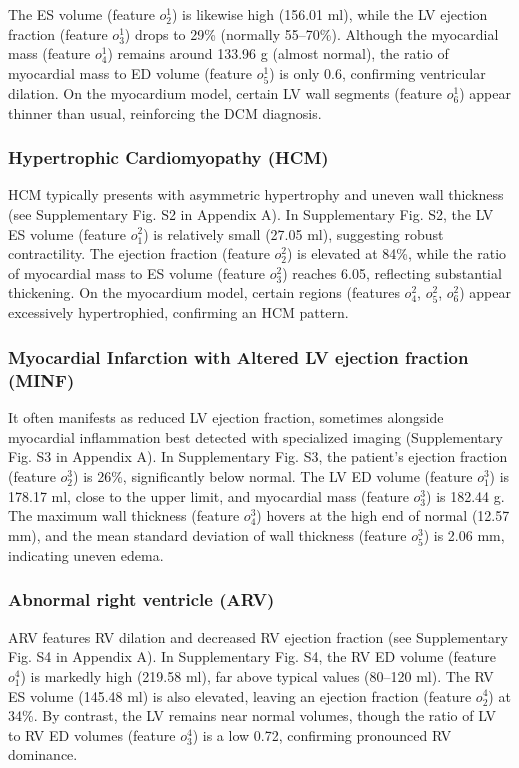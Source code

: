 \documentclass[fleqn,10pt]{wlscirep}
\begin{document}
The ES volume (feature \(o_2^1\)) is likewise high (156.01 ml), while the LV ejection fraction (feature \(o_3^1\)) drops to 29\% (normally 55–70\%). Although the myocardial mass (feature \(o_4^1\)) remains around 133.96 g (almost normal), the ratio of myocardial mass to ED volume (feature \(o_5^1\)) is only 0.6, confirming ventricular dilation. On the myocardium model, certain LV wall segments (feature \(o_6^1\)) appear thinner than usual, reinforcing the DCM diagnosis.

\subsubsection*{Hypertrophic Cardiomyopathy (HCM)}

HCM typically presents with asymmetric hypertrophy and uneven wall thickness (see Supplementary Fig. S2 in Appendix A). In Supplementary Fig. S2, the LV ES volume (feature \(o_1^2\)) is relatively small (27.05 ml), suggesting robust contractility. The ejection fraction (feature \(o_2^2\)) is elevated at 84\%, while the ratio of myocardial mass to ES volume (feature \(o_3^2\)) reaches 6.05, reflecting substantial thickening. On the myocardium model, certain regions (features \(o_4^2\), \(o_5^2\), \(o_6^2\)) appear excessively hypertrophied, confirming an HCM pattern.

\subsubsection*{Myocardial Infarction with Altered LV ejection fraction (MINF)}

It often manifests as reduced LV ejection fraction, sometimes alongside myocardial inflammation best detected with specialized imaging (Supplementary Fig. S3 in Appendix A). In Supplementary Fig. S3, the patient’s ejection fraction (feature \(o_2^3\)) is 26\%, significantly below normal. The LV ED volume (feature \(o_1^3\)) is 178.17 ml, close to the upper limit, and myocardial mass (feature \(o_3^3\)) is 182.44 g. The maximum wall thickness (feature \(o_4^3\)) hovers at the high end of normal (12.57 mm), and the mean standard deviation of wall thickness (feature \(o_5^3\)) is 2.06 mm, indicating uneven edema.

\subsubsection*{Abnormal right ventricle (ARV)}

ARV features RV dilation and decreased RV ejection fraction (see Supplementary Fig. S4 in Appendix A). In Supplementary Fig. S4, the RV ED volume (feature \(o_1^4\)) is markedly high (219.58 ml), far above typical values (80–120 ml). The RV ES volume (145.48 ml) is also elevated, leaving an ejection fraction (feature \(o_2^4\)) at 34\%. By contrast, the LV remains near normal volumes, though the ratio of LV to RV ED volumes (feature \(o_3^4\)) is a low 0.72, confirming pronounced RV dominance.
\end{document}
